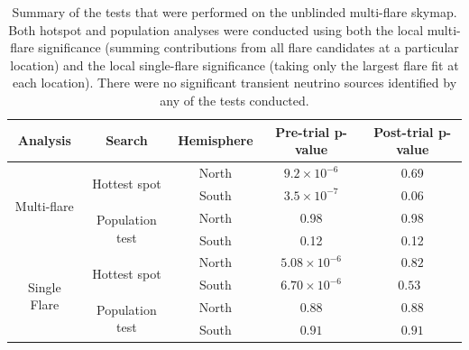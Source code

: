 \begin{table}[h]
\centering
\begin{tabular}{ccccc}
    \hline
    \hline
    Analysis & Search & Hemisphere & Pre-trial p-value & Post-trial p-value\\[3pt] \hline
    \multirow{4}{*}{Multi-flare} & \multirow{2}{*}{Hottest spot} & North & $9.2\times10^{-6}$ & 0.69\\ & & South & $3.5\times10^{-7}$ & 0.06 \\ \cline{2-5}  & \multirow{2}{*}{Population test} & North & 0.98 & 0.98\\ & & South & 0.12 & 0.12\\ [3pt] \hline
    \multirow{4}{*}{Single Flare} & \multirow{2}{*}{Hottest spot} & North & $5.08\times10^{-6}$& $0.82$\\ & & South & $6.70\times10^{-6}$& $0.53$\ \\ \cline{2-5}  & \multirow{2}{*}{Population test} & North & $0.88$ & $0.88$\\ & & South & $0.91$ & $0.91$ \\
    \hline
    \hline
\end{tabular}
\caption{Summary of the tests that were performed on the unblinded multi-flare skymap. Both hotspot and population analyses were conducted using both the local multi-flare significance (summing contributions from all flare candidates at a particular location) and the local single-flare significance (taking only the largest flare fit at each location). There were no significant transient neutrino sources identified by any of the tests conducted. }
\label{tab:popresults}
\end{table}

